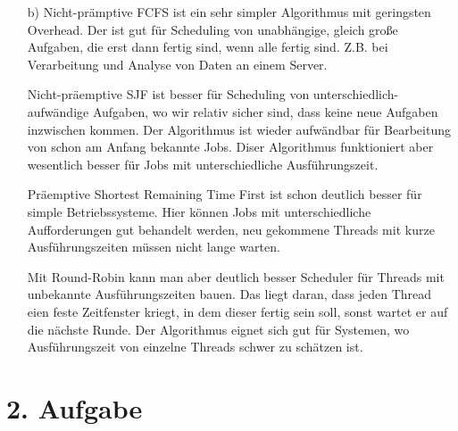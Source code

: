 \begin{enumerate}
\begin{enumerate}
\end{enumerate}

\item[b)]
Nicht-prämptive FCFS ist ein sehr simpler Algorithmus mit geringsten Overhead. Der ist gut für Scheduling von unabhängige, gleich große Aufgaben, die erst dann fertig sind, wenn alle fertig sind. Z.B. bei Verarbeitung und Analyse von Daten an einem Server.

Nicht-präemptive SJF ist besser für Scheduling von unterschiedlich-aufwändige Aufgaben, wo wir relativ sicher sind, dass keine neue Aufgaben inzwischen kommen. Der Algorithmus ist wieder aufwändbar für Bearbeitung von schon am Anfang bekannte Jobs. Diser Algorithmus funktioniert aber wesentlich besser für Jobs mit unterschiedliche Ausführungszeit.

Präemptive Shortest Remaining Time First ist schon deutlich besser für simple Betriebssysteme. Hier können Jobs mit unterschiedliche Aufforderungen gut behandelt werden, neu gekommene Threads mit kurze Ausführungszeiten müssen nicht lange warten. 

Mit Round-Robin kann man aber deutlich besser Scheduler für Threads mit unbekannte Ausführungszeiten bauen. Das liegt daran, dass jeden Thread eien feste Zeitfenster kriegt, in dem dieser fertig sein soll, sonst wartet er auf die nächste Runde. Der Algorithmus eignet sich gut für Systemen, wo Ausführungszeit von einzelne Threads schwer zu schätzen ist.

\end{enumerate}

\section*{2. Aufgabe}

